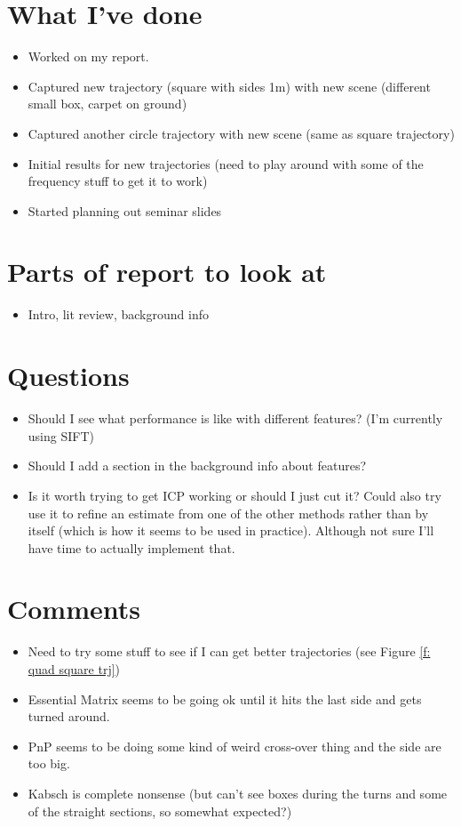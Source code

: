 \documentclass[12pt,a4paper]{article}
\begin{document}
\author{Katrina Ashton}


\pagestyle{fancy}
\fancyhf{}
\rhead{\thepage}

\section{What I've done}
\begin{itemize}
  \item Worked on my report.
  \item Captured new trajectory (square with sides 1m) with new scene (different small box, carpet on ground)
  \item Captured another circle trajectory with new scene (same as square trajectory)
  \item Initial results for new trajectories (need to play around with some of the frequency stuff to get it to work)
  \item Started planning out seminar slides
\end{itemize}

\section{Parts of report to look at}
\begin{itemize}
\item Intro, lit review, background info
\end{itemize}

\section{Questions}
\begin{itemize}
\item Should I see what performance is like with different features? (I'm currently using SIFT)
\item Should I add a section in the background info about features?
\item Is it worth trying to get ICP working or should I just cut it? Could also try use it to refine an estimate from one of the other methods rather than by itself (which is how it seems to be used in practice). Although not sure I'll have time to actually implement that.
\end{itemize}

\section{Comments}
\begin{itemize}
  \item Need to try some stuff to see if I can get better trajectories (see Figure \ref{f: quad square trj})
  \item Essential Matrix seems to be going ok until it hits the last side and gets turned around.
  \item PnP seems to be doing some kind of weird cross-over thing and the side are too big.
  \item Kabsch is complete nonsense (but can't see boxes during the turns and some of the straight sections, so somewhat expected?)
\end{itemize}
\end{document}
